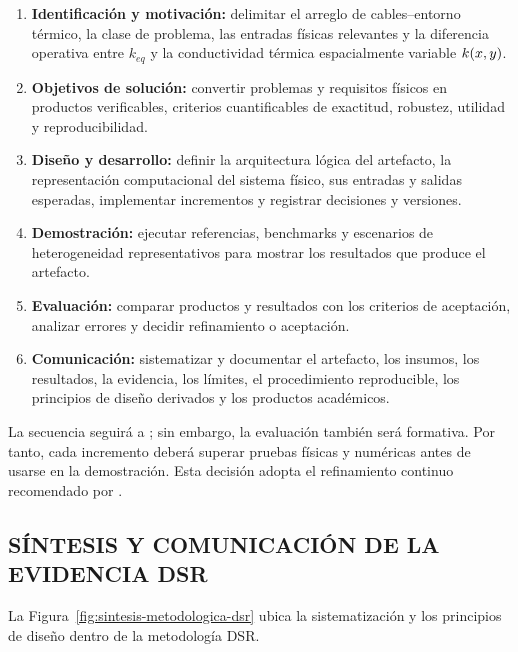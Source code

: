 \begin{procedure}[htbp]
\caption{Proceso DSR adaptado al estudio. Fuente: Elaboración propia.}
\label{proc:dsr}
\begin{enumerate}[label=\textbf{A\arabic*.}]
  \item \textbf{Identificación y motivación:} delimitar el arreglo de cables--entorno térmico, la clase de problema, las entradas físicas relevantes y la diferencia operativa entre $k_{eq}$ y la conductividad térmica espacialmente variable $k(x,y)$.
  \item \textbf{Objetivos de solución:} convertir problemas y requisitos físicos en productos verificables, criterios cuantificables de exactitud, robustez, utilidad y reproducibilidad.
  \item \textbf{Diseño y desarrollo:} definir la arquitectura lógica del artefacto, la representación computacional del sistema físico, sus entradas y salidas esperadas, implementar incrementos y registrar decisiones y versiones.
  \item \textbf{Demostración:} ejecutar referencias, benchmarks y escenarios de heterogeneidad representativos para mostrar los resultados que produce el artefacto.
  \item \textbf{Evaluación:} comparar productos y resultados con los criterios de aceptación, analizar errores y decidir refinamiento o aceptación.
  \item \textbf{Comunicación:} sistematizar y documentar el artefacto, los insumos, los resultados, la evidencia, los límites, el procedimiento reproducible, los principios de diseño derivados y los productos académicos.
\end{enumerate}
\end{procedure}

La secuencia seguirá a \textcite[55--56]{peffers2007}; sin embargo, la evaluación también será formativa. Por tanto, cada incremento deberá superar pruebas físicas y numéricas antes de usarse en la demostración. Esta decisión adopta el refinamiento continuo recomendado por \textcite[198--203]{delport2024}.

\subsection{SÍNTESIS Y COMUNICACIÓN DE LA EVIDENCIA DSR}
\label{subsec:sintesis-dsr}

La Figura~\ref{fig:sintesis-metodologica-dsr} ubica la sistematización y los principios de diseño dentro de la metodología DSR.


